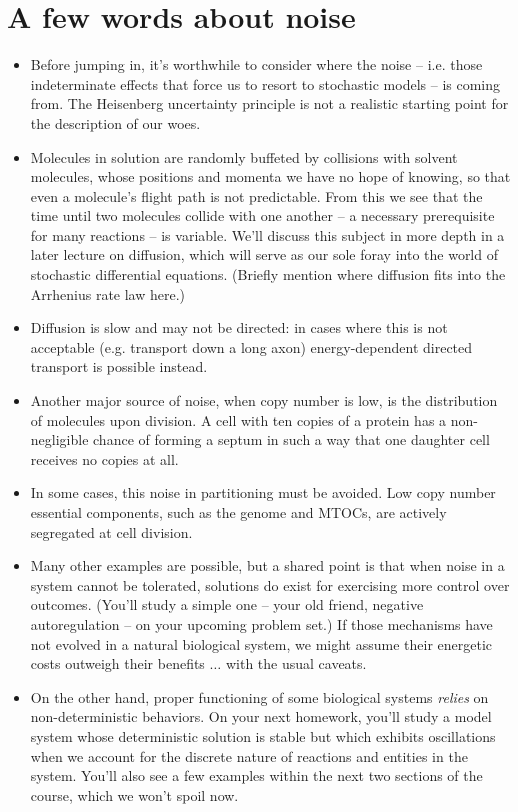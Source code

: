 \documentclass{article}
\begin{document}
\section*{A few words about noise}
\begin{itemize}
\item Before jumping in, it's worthwhile to consider where the noise -- i.e. those indeterminate effects that force us to resort to stochastic models -- is coming from. The Heisenberg uncertainty principle is not a realistic starting point for the description of our woes.
\item Molecules in solution are randomly buffeted by collisions with solvent molecules, whose positions and momenta we have no hope of knowing, so that even a molecule's flight path is not predictable. From this we see that the time until two molecules collide with one another -- a necessary prerequisite for many reactions -- is variable. We'll discuss this subject in more depth in a later lecture on diffusion, which will serve as our sole foray into the world of stochastic differential equations. (Briefly mention where diffusion fits into the Arrhenius rate law here.)
\item Diffusion is slow and may not be directed: in cases where this is not acceptable (e.g. transport down a long axon) energy-dependent directed transport is possible instead.
\item Another major source of noise, when copy number is low, is the distribution of molecules upon division. A cell with ten copies of a protein has a non-negligible chance of forming a septum in such a way that one daughter cell receives no copies at all.
\item In some cases, this noise in partitioning must be avoided. Low copy number essential components, such as the genome and MTOCs, are actively segregated at cell division.
\item Many other examples are possible, but a shared point is that when noise in a system cannot be tolerated, solutions do exist for exercising more control over outcomes. (You'll study a simple one -- your old friend, negative autoregulation -- on your upcoming problem set.) If those mechanisms have not evolved in a natural biological system, we might assume their energetic costs outweigh their benefits $\ldots$ with the usual caveats.
\item On the other hand, proper functioning of some biological systems \textit{relies} on non-deterministic behaviors. On your next homework, you'll study a model system whose deterministic solution is stable but which exhibits oscillations when we account for the discrete nature of reactions and entities in the system. You'll also see a few examples within the next two sections of the course, which we won't spoil now.
\end{itemize}
\end{document}
